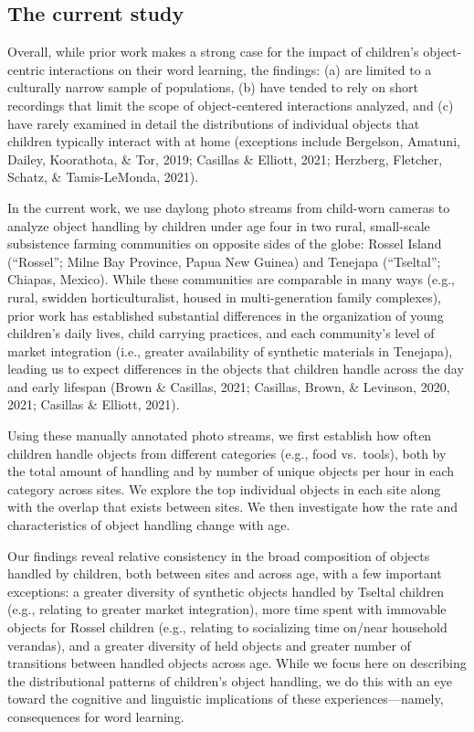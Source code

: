 \documentclass[10pt, letterpaper]{article}
\begin{document}
\hypertarget{the-current-study}{%
\subsection{The current study}\label{the-current-study}}

Overall, while prior work makes a strong case for the impact of
children's object-centric interactions on their word learning, the
findings: (a) are limited to a culturally narrow sample of populations,
(b) have tended to rely on short recordings that limit the scope of
object-centered interactions analyzed, and (c) have rarely examined in
detail the distributions of individual objects that children typically
interact with at home (exceptions include Bergelson, Amatuni, Dailey,
Koorathota, \& Tor, 2019; Casillas \& Elliott, 2021; Herzberg, Fletcher,
Schatz, \& Tamis-LeMonda, 2021).

In the current work, we use daylong photo streams from child-worn
cameras to analyze object handling by children under age four in two
rural, small-scale subsistence farming communities on opposite sides of
the globe: Rossel Island (``Rossel''; Milne Bay Province, Papua New
Guinea) and Tenejapa (``Tseltal''; Chiapas, Mexico). While these
communities are comparable in many ways (e.g., rural, swidden
horticulturalist, housed in multi-generation family complexes), prior
work has established substantial differences in the organization of
young children's daily lives, child carrying practices, and each
community's level of market integration (i.e., greater availability of
synthetic materials in Tenejapa), leading us to expect differences in
the objects that children handle across the day and early lifespan
(Brown \& Casillas, 2021; Casillas, Brown, \& Levinson, 2020, 2021;
Casillas \& Elliott, 2021).

Using these manually annotated photo streams, we first establish how
often children handle objects from different categories (e.g., food
vs.~tools), both by the total amount of handling and by number of unique
objects per hour in each category across sites. We explore the top
individual objects in each site along with the overlap that exists
between sites. We then investigate how the rate and characteristics of
object handling change with age.

Our findings reveal relative consistency in the broad composition of
objects handled by children, both between sites and across age, with a
few important exceptions: a greater diversity of synthetic objects
handled by Tseltal children (e.g., relating to greater market
integration), more time spent with immovable objects for Rossel children
(e.g., relating to socializing time on/near household verandas), and a
greater diversity of held objects and greater number of transitions
between handled objects across age. While we focus here on describing
the distributional patterns of children's object handling, we do this
with an eye toward the cognitive and linguistic implications of these
experiences---namely, consequences for word learning.
\end{document}
